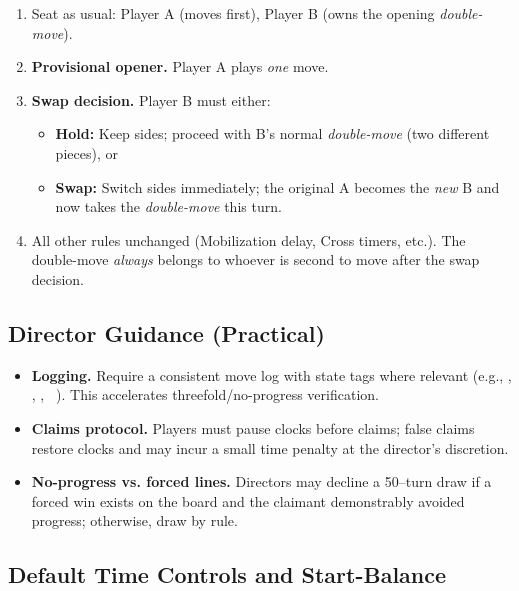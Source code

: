 \documentclass[11pt]{article}
\newcommand{\CC}[1]{\textcolor{blue!60!black}{\scriptsize\ttfamily[CF:#1]}}
\newcommand{\SC}[1]{\textcolor{red!60!black}{\scriptsize\ttfamily[S:#1]}}
\newcommand{\RoC}{\textcolor{teal!60!black}{\scriptsize\ttfamily[Rooted]}}
\newcommand{\RC}{\textcolor{purple!70!black}{\scriptsize\ttfamily[RC]}}
\renewcommand{\RC}[1][]{%
  \textcolor{purple!70!black}{\scriptsize\ttfamily[RC%
  \if\relax\detokenize{#1}\relax\else~#1\fi]}}
\begin{document}
\begin{rulevariant}[title={Pie Rule (Tournament Variant)}]
\begin{enumerate}\itemsep0.25em
  \item Seat as usual: Player A (moves first), Player B (owns the opening \emph{double-move}).
  \item \textbf{Provisional opener.} Player A plays \emph{one} move.
  \item \textbf{Swap decision.} Player B must either:
  \begin{itemize}\itemsep=0.2em
    \item \textbf{Hold:} Keep sides; proceed with B’s normal \emph{double-move} (two different pieces), or
    \item \textbf{Swap:} Switch sides immediately; the original A becomes the \emph{new} B and now takes the \emph{double-move} this turn.
  \end{itemize}
  \item All other rules unchanged (Mobilization delay, Cross timers, etc.). The double-move \emph{always} belongs to whoever is second to move after the swap decision.
\end{enumerate}
\end{rulevariant}

\medskip
\subsection{Director Guidance (Practical)}

\begin{itemize}[leftmargin=1.3em,itemsep=0.2em]
  \item \textbf{Logging.} Require a consistent move log with state tags where relevant (e.g., \texttt{\RoC}, \texttt{\CC{in 1/3}}, \texttt{\SC{H}}, \texttt{\RC[3/5]}). This accelerates threefold/no-progress verification.
  \item \textbf{Claims protocol.} Players must pause clocks before claims; false claims restore clocks and may incur a small time penalty at the director’s discretion.
  \item \textbf{No-progress vs. forced lines.} Directors may decline a 50–turn draw if a forced win exists on the board and the claimant demonstrably avoided progress; otherwise, draw by rule.
\end{itemize}

\subsection{Default Time Controls and Start-Balance}
\label{subsec:time_defaults}
\end{document}
